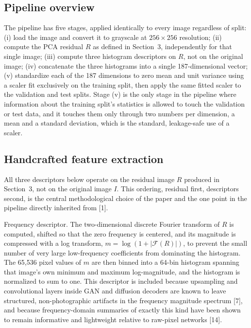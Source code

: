 \documentclass[11pt]{article}
\begin{document}
\subsection{Pipeline overview}

The pipeline has five stages, applied identically to every image regardless of split: (i) load the image and convert it to grayscale at $256\times256$ resolution; (ii) compute the PCA residual $R$ as defined in Section~3, independently for that single image; (iii) compute three histogram descriptors on $R$, not on the original image; (iv) concatenate the three histograms into a single 187-dimensional vector; (v) standardize each of the 187 dimensions to zero mean and unit variance using a scaler fit exclusively on the training split, then apply the same fitted scaler to the validation and test splits. Stage (v) is the only stage in the pipeline where information about the training split's statistics is allowed to touch the validation or test data, and it touches them only through two numbers per dimension, a mean and a standard deviation, which is the standard, leakage-safe use of a scaler.

\subsection{Handcrafted feature extraction}

All three descriptors below operate on the residual image $R$ produced in Section~3, not on the original image $I$. This ordering, residual first, descriptors second, is the central methodological choice of the paper and the one point in the pipeline directly inherited from [1].

Frequency descriptor. The two-dimensional discrete Fourier transform of $R$ is computed, shifted so that the zero frequency is centered, and its magnitude is compressed with a log transform, $m = \log(1 + |\mathcal{F}(R)|)$, to prevent the small number of very large low-frequency coefficients from dominating the histogram. The 65,536 pixel values of $m$ are then binned into a 64-bin histogram spanning that image's own minimum and maximum log-magnitude, and the histogram is normalized to sum to one. This descriptor is included because upsampling and convolutional layers inside GAN and diffusion decoders are known to leave structured, non-photographic artifacts in the frequency magnitude spectrum [7], and because frequency-domain summaries of exactly this kind have been shown to remain informative and lightweight relative to raw-pixel networks [14].
\end{document}
